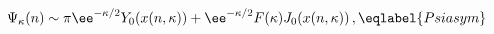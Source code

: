 \begin{equation}
\Psi_\kappa(n)\sim \pi\ee^{-\kappa/2} Y_0(x(n,\kappa)) 
+ \ee^{-\kappa/2} F(\kappa) J_0(x(n,\kappa)) \,,
\eqlabel{Psiasym}
\end{equation}

